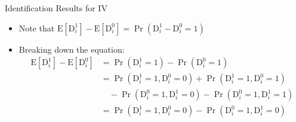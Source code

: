 \documentclass[dvipsnames,hyperref={pdfpagelabels=false}]{beamer}
\begin{document}
\begin{frame}{Identification Results for IV}
	\begin{itemize}
\item Note that	$\mathrm{E}[\mathrm{D}^{1}_{i}]-\mathrm{E}[\mathrm{D}^{0}_{i}] = \Pr(\mathrm{D}^{1}_{i}-\mathrm{D}^{0}_{i}=1)$
\vspace{0.2cm}
		\item Breaking down the equation:
		\begin{equation*}
			\begin{aligned}
				\mathrm{E}[\mathrm{D}^{1}_{i}]-\mathrm{E}[\mathrm{D}^{0}_{i}] &= \Pr(\mathrm{D}^{1}_{i}=1) - \Pr(\mathrm{D}^{0}_{i}=1) \\
				&= \Pr(\mathrm{D}^{1}_{i}=1, \mathrm{D}^{0}_{i}=0) + \Pr(\mathrm{D}^{1}_{i}=1, \mathrm{D}^{0}_{i}=1) \\
				&\quad - \Pr(\mathrm{D}^{0}_{i}=1, \mathrm{D}^{1}_{i}=0) - \Pr(\mathrm{D}^{0}_{i}=1, \mathrm{D}^{1}_{i}=1) \\
				&= \Pr(\mathrm{D}^{1}_{i}=1, \mathrm{D}^{0}_{i}=0) - \Pr(\mathrm{D}^{0}_{i}=1, \mathrm{D}^{1}_{i}=0)
			\end{aligned}

\end{equation*}
\end{itemize}
\end{frame}
\end{document}
